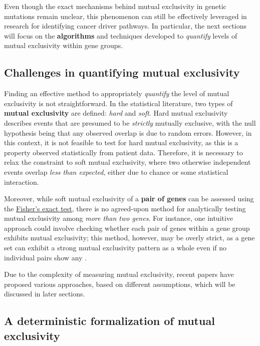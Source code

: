 Even though the exact mechanisms behind mutual exclusivity in genetic mutations remain unclear, this phenomenon can still be effectively leveraged in research for identifying cancer driver pathways. In particular, the next sections will focus on the \textbf{algorithms} and techniques developed to \textit{quantify} levels of mutual exclusivity within gene groups.

\subsection{Challenges in quantifying mutual exclusivity}

Finding an effective method to appropriately \textit{quantify} the level of mutual exclusivity is not straightforward. In the statistical literature, two types of \textbf{mutual exclusivity} are defined: \textit{hard} and \textit{soft}. Hard mutual exclusivity describes events that are presumed to be \textit{strictly} mutually exclusive, with the null hypothesis being that any observed overlap is due to random errors. However, in this context, it is not feasible to test for hard mutual exclusivity, as this is a property observed statistically from patient data. Therefore, it is necessary to relax the constraint to soft mutual exclusivity, where two otherwise independent events overlap \textit{less than expected}, either due to chance or some statistical interaction.

Moreover, while soft mutual exclusivity of a \textbf{pair of genes} can be assessed using the \href{https://en.wikipedia.org/wiki/Fisher\%27s_exact_test}{Fisher's exact test}, there is no agreed-upon method for analytically testing mutual exclusivity among \textit{more than two genes}. For instance, one intuitive approach could involve checking whether each pair of genes within a gene group exhibits mutual exclusivity; this method, however, may be overly strict, as a gene set can exhibit a strong mutual exclusivity pattern as a whole even if no individual pairs show any \cite{mutex}.

Due to the complexity of measuring mutual exclusivity, recent papers have proposed various approaches, based on different assumptions, which will be discussed in later sections.

\subsection{A deterministic formalization of mutual exclusivity}

